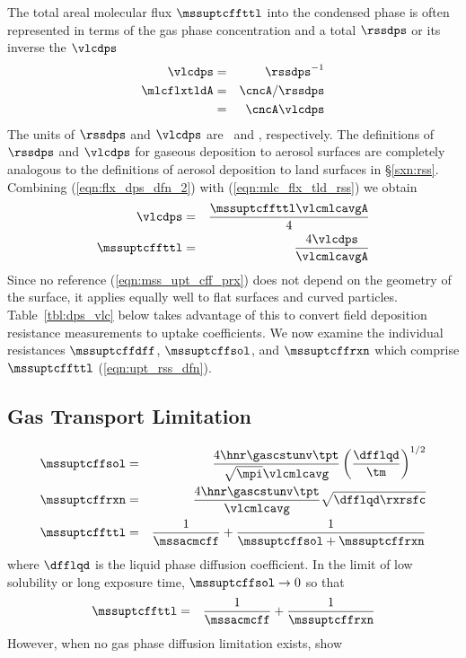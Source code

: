 \documentclass[12pt,twoside]{book}
\begin{document}
The total areal molecular flux $\mssuptcffttl$ into the condensed
phase is often represented in terms of the gas phase
concentration and a total  $\rssdps$ or
its inverse the  $\vlcdps$
\begin{eqnarray}
\label{eqn:vlc_dps_dfn_2}
\vlcdps & = & \rssdps^{-1} \\
\mlcflxtldA & = & \cncA / \rssdps \nonumber \\
& = & \cncA \vlcdps
\label{eqn:flx_dps_dfn_2}
\end{eqnarray}
The units of $\rssdps$ and $\vlcdps$ are \sxm\ and \mxs, respectively. 
The definitions of $\rssdps$ and $\vlcdps$ for gaseous deposition to
aerosol surfaces are completely analogous to the definitions of
aerosol deposition to land surfaces in \S\ref{sxn:rss}.
Combining (\ref{eqn:flx_dps_dfn_2}) with (\ref{eqn:mlc_flx_tld_rss})
we obtain
\begin{eqnarray}
\label{eqn:vlc_dps_dfn_3}
\vlcdps & = & \frac{\mssuptcffttl \vlcmlcavgA}{4} \\
\label{eqn:mss_upt_cff_prx}
\mssuptcffttl & = & \frac{4 \vlcdps}{\vlcmlcavgA }
\end{eqnarray}
Since no reference (\ref{eqn:mss_upt_cff_prx}) does not depend on the
geometry of the surface, it applies equally well to flat surfaces and
curved particles.
Table~\ref{tbl:dps_vlc} below takes advantage of this to convert
field deposition resistance measurements to uptake coefficients.
We now examine the individual resistances 
$\mssuptcffdff$, $\mssuptcffsol$, and $\mssuptcffrxn$ which comprise
$\mssuptcffttl$ (\ref{eqn:upt_rss_dfn}).

\subsection[Gas Transport Limitation]{Gas Transport Limitation}\label{sxn:dff_lmt}

\begin{eqnarray}
\mssuptcffsol & = & \frac{4 \hnr \gascstunv \tpt}{\sqrt{\mpi} \vlcmlcavg
} \left( \frac{\dfflqd}{\tm } \right)^{1/2} \\ 
\mssuptcffrxn & = & \frac{4 \hnr \gascstunv \tpt}{\vlcmlcavg } 
\sqrt{ \dfflqd \rxrsfc } \\ 
\mssuptcffttl & = & \frac{1}{\mssacmcff } + \frac{1}{\mssuptcffsol +
\mssuptcffrxn }
\label{eqn:mss_upt_dfn}
\end{eqnarray}
where $\dfflqd$ is the liquid phase diffusion coefficient.
In the limit of low solubility or long exposure time, $\mssuptcffsol
\rightarrow 0$ so that 
\begin{eqnarray}
\mssuptcffttl & = & \frac{1}{\mssacmcff } + \frac{1}{\mssuptcffrxn }
\label{eqn:mss_upt_dfn_2}
\end{eqnarray}
However, when no gas phase diffusion limitation exists, \cite{KWZ95}
show 
\end{document}
